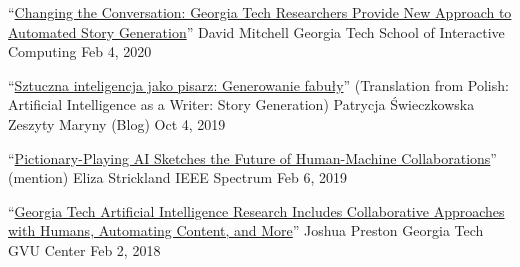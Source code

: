   \cvmedia
    {``\href{https://www.ic.gatech.edu/news/632082/changing-conversation-georgia-tech-researchers-provide-new-approach-automated-story}{Changing the Conversation: Georgia Tech Researchers Provide New Approach to Automated Story Generation}''} %
    {David Mitchell} %
    {Georgia Tech School of Interactive Computing} %
    {Feb 4, 2020} %

  \cvmedia
    {``\href{https://zeszytymaryny.pl/naukowo/sztuczna-inteligencja-jako-pisarz-generowanie-fabuly/}{Sztuczna inteligencja jako pisarz: Generowanie fabuły}'' \newline (Translation from Polish: Artificial Intelligence as a Writer: Story Generation)} %
    {Patrycja Świeczkowska} %
    {Zeszyty Maryny (Blog)} %
    {Oct 4, 2019} %


  \cvmedia
    {``\href{https://spectrum.ieee.org/tech-talk/robotics/artificial-intelligence/pictionary-playing-ai-sketches-the-future-of-human-machine-collaborations}{Pictionary-Playing AI Sketches the Future of Human-Machine Collaborations}'' (mention)} %
    {Eliza Strickland} %
    {IEEE Spectrum} %
    {Feb 6, 2019} %


  \cvmedia
    {``\href{https://gvu.gatech.edu/georgia-tech-aaai2018}{Georgia Tech Artificial Intelligence Research Includes Collaborative Approaches with Humans, Automating Content, and More}''} %
    {Joshua Preston} %
    {Georgia Tech GVU Center} %
    {Feb 2, 2018} %




